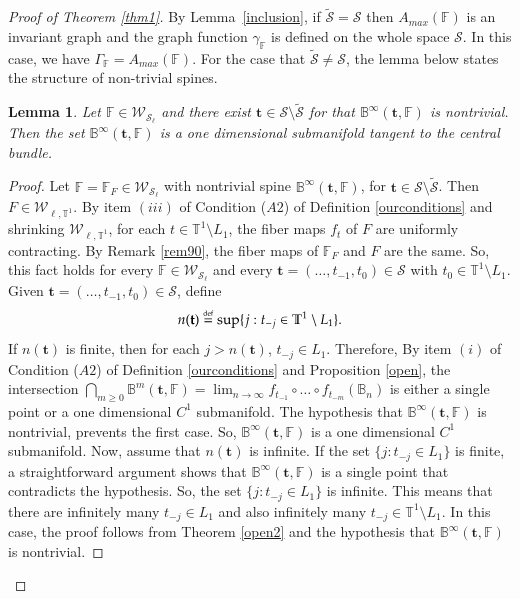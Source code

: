 \documentclass[11pt,reqno]{amsart}
\theoremstyle{plain}
\newtheorem{lemma}[theorem]{Lemma}
\newtheorem*{theorem A}{Theorem A}
\newtheorem*{theorem B}{Theorem B}
\newtheorem*{theorem C}{Theorem C}
\newtheorem*{theorem 1}{Theorem 1}
\newtheorem*{theorem 2}{Theorem 2}
\newtheorem*{theorem 3}{Theorem 3}
\newcommand{\eqdef}{\stackrel{\scriptscriptstyle\rm def}{=}}
\numberwithin{equation}{section}
\begin{document}
\begin{proof}[Proof of Theorem \ref{thm1}]
By Lemma~\ref{inclusion}, if $\widetilde{\mathcal{S}}=\mathcal{S}$ then $A_{max}(\mathbb{F})$ is an invariant graph and the graph function $\gamma_{\mathbb{F}}$ is defined on the whole space $\mathcal{S}$.
In this case, we have $\Gamma_{\mathbb{F}} = A_{max}(\mathbb{F})$.
For the case that $\widetilde{\mathcal{S}}\neq\mathcal{S}$, the lemma below states the structure of non-trivial spines.

\begin{lemma}\label{tangent}
Let $\mathbb{F} \in \mathcal{W}_{\mathcal{S}_\ell}$ and there exist $\textbf{t} \in \mathcal{S} \setminus \widetilde{\mathcal{S}}$ for that $ \mathbb{B}^{\infty}(\textbf{t},\mathbb{F})$ is nontrivial.
Then the set $ \mathbb{B}^{\infty}(\textbf{t},\mathbb{F})$ is a one dimensional submanifold tangent to the central bundle.
\end{lemma}

\begin{proof}
Let $\mathbb{F}=\mathbb{F}_{F} \in \mathcal{W}_{\mathcal{S}_\ell} $ with nontrivial spine $ \mathbb{B}^{\infty}(\textbf{t},\mathbb{F})$, for $\textbf{t} \in \mathcal{S} \setminus \widetilde{\mathcal{S}}$. Then $F \in \mathcal{W}_{\ell, \mathbb{T}^1} $.
By item $(iii)$ of Condition ($A2$) of Definition \ref{ourconditions} and shrinking $\mathcal{W}_{\ell, \mathbb{T}^1} $, for each $t \in \mathbb{T}^1 \setminus L_1$, the fiber maps $f_t$ of $F$ are uniformly contracting.
By Remark \ref{rem90}, the fiber maps of $\mathbb{F}_{F}$ and $F$ are the same.
So, this fact holds for every $\mathbb{F} \in \mathcal{W}_{\mathcal{S}_\ell} $ and every $\textbf{t}=(\dots, t_{-1}, t_0) \in \mathcal{S} $ with $t_0 \in \mathbb{T}^1 \setminus L_1 $.
Given $\textbf{t}=(\dots, t_{-1}, t_0) \in \mathcal{S} $, define
 \begin{equation*}
    n(\textbf{t})\eqdef \sup \{j: t_{-j} \in \mathbb{T}^1 \setminus L_1\}.
   \end{equation*}
If $n(\textbf{t})$ is finite, then for each $j > n(\textbf{t})$, $t_{-j}\in L_1$.
Therefore, By item $(i)$ of Condition ($A2$) of Definition \ref{ourconditions} and Proposition \ref{open}, the intersection $\bigcap_{m\geq 0} \mathbb{B}^m(\textbf{t},\mathbb{F})=\lim_{n \to \infty}f_{t_{-1}}\circ \dots \circ f_{t_{-m}}(\mathbb{B}_n)$ is either a single point or a one dimensional $C^1$ submanifold.
 The hypothesis that $ \mathbb{B}^{\infty}(\textbf{t},\mathbb{F})$ is nontrivial, prevents the first case.
So, $ \mathbb{B}^{\infty}(\textbf{t},\mathbb{F})$ is a one dimensional $C^1$ submanifold.
Now, assume that $n(\textbf{t})$ is infinite. If the set $\{j: t_{-j} \in L_1\}$ is finite, a straightforward argument shows that $ \mathbb{B}^{\infty}(\textbf{t},\mathbb{F})$ is a single point that contradicts the hypothesis. So, the set $\{j: t_{-j} \in L_1\}$ is infinite. This means that there are infinitely many $t_{-j} \in L_1$ and also infinitely many $t_{-j} \in \mathbb{T}^1 \setminus L_1$. In this case, the proof follows from Theorem \ref{open2} and the hypothesis that $ \mathbb{B}^{\infty}(\textbf{t},\mathbb{F})$ is nontrivial.
 \end{proof}


\end{proof}
\end{document}
